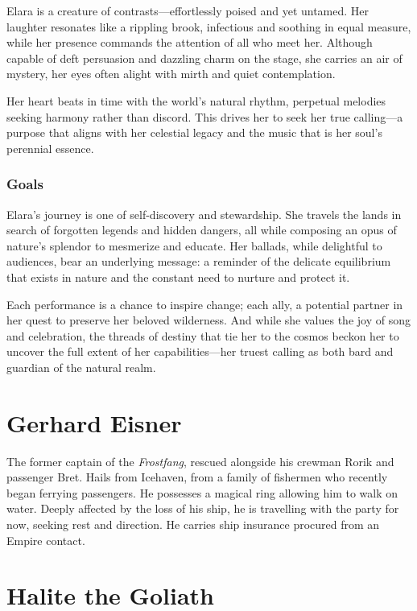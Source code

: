\documentclass[
  letterpaper,12pt,twoside,twocolumn,openany,
  nodeprecatedcode,bg=full]{dndbook}
\begin{document}
Elara is a creature of contrasts---effortlessly poised and yet untamed.
Her laughter resonates like a rippling brook, infectious and soothing in
equal measure, while her presence commands the attention of all who meet
her. Although capable of deft persuasion and dazzling charm on the
stage, she carries an air of mystery, her eyes often alight with mirth
and quiet contemplation.

Her heart beats in time with the world's natural rhythm, perpetual
melodies seeking harmony rather than discord. This drives her to seek
her true calling---a purpose that aligns with her celestial legacy and
the music that is her soul's perennial essence.

\subsection{Goals}\label{goals}

Elara's journey is one of self-discovery and stewardship. She travels
the lands in search of forgotten legends and hidden dangers, all while
composing an opus of nature's splendor to mesmerize and educate. Her
ballads, while delightful to audiences, bear an underlying message: a
reminder of the delicate equilibrium that exists in nature and the
constant need to nurture and protect it.

Each performance is a chance to inspire change; each ally, a potential
partner in her quest to preserve her beloved wilderness. And while she
values the joy of song and celebration, the threads of destiny that tie
her to the cosmos beckon her to uncover the full extent of her
capabilities---her truest calling as both bard and guardian of the
natural realm.

\chapter{Gerhard Eisner}\label{gerhard-eisner}

The former captain of the \emph{Frostfang}, rescued alongside his
crewman Rorik and passenger Bret. Hails from Icehaven, from a family of
fishermen who recently began ferrying passengers. He possesses a magical
ring allowing him to walk on water. Deeply affected by the loss of his
ship, he is travelling with the party for now, seeking rest and
direction. He carries ship insurance procured from an Empire contact.

\chapter{Halite the Goliath}\label{halite-the-goliath}
\end{document}
